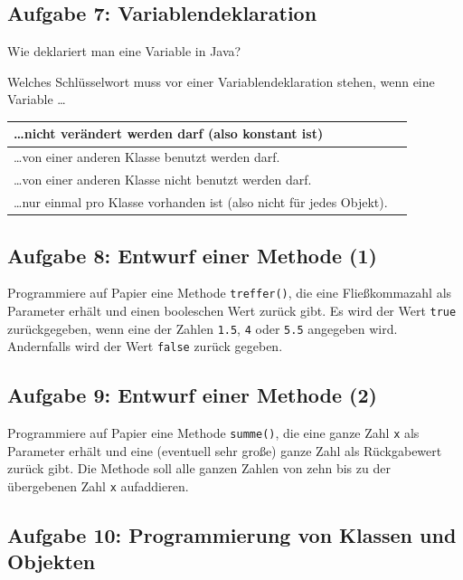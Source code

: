 \subsection{Aufgabe 7: Variablendeklaration}

\begin{compactenum}[a)]
\item Wie deklariert man eine Variable in Java?
\item Welches Schlüsselwort muss vor einer Variablendeklaration stehen, wenn
eine Variable \ldots 

\bgroup
\def\arraystretch{1.2}
\begin{tabular}{|l|p{45mm}|}
\hline
\ldots nicht verändert werden darf (also konstant ist) & \\ \hline
\ldots von einer anderen Klasse benutzt werden darf. & \\ \hline
\ldots von einer anderen Klasse nicht benutzt werden darf. & \\ \hline
\ldots nur einmal pro Klasse vorhanden ist (also nicht für jedes Objekt). & 
\\ \hline
\end{tabular}
\egroup
\end{compactenum}


\subsection{Aufgabe 8: Entwurf einer Methode (1)}

Programmiere auf Papier eine Methode \lstinline|treffer()|, die eine
Fließkommazahl als Parameter erhält und einen booleschen Wert zurück gibt. Es
wird der Wert \lstinline|true| zurückgegeben, wenn eine der Zahlen
\lstinline|1.5|, \lstinline|4| oder \lstinline|5.5| angegeben wird. Andernfalls
wird der Wert \lstinline|false| zurück gegeben.


\subsection{Aufgabe 9: Entwurf einer Methode (2)}

Programmiere auf Papier eine Methode \lstinline|summe()|, die eine ganze Zahl
\lstinline|x| als Parameter erhält und eine (eventuell sehr große) ganze Zahl
als Rückgabewert zurück gibt. Die Methode soll alle ganzen Zahlen von zehn bis zu
der übergebenen Zahl \lstinline|x| aufaddieren.


\subsection{Aufgabe 10: Programmierung von Klassen und Objekten}

